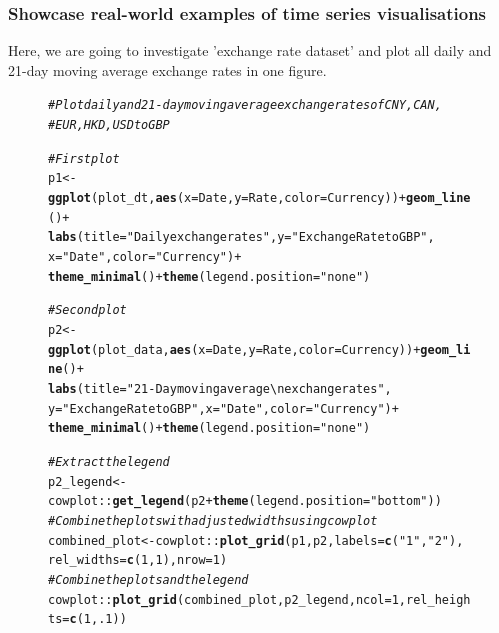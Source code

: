 \documentclass{article}\usepackage[]{graphicx}\usepackage[]{xcolor}
\makeatletter
\newcommand{\hlnum}[1]{\textcolor[rgb]{0.686,0.059,0.569}{#1}}%
\newcommand{\hlstr}[1]{\textcolor[rgb]{0.192,0.494,0.8}{#1}}%
\newcommand{\hlcom}[1]{\textcolor[rgb]{0.678,0.584,0.686}{\textit{#1}}}%
\newcommand{\hlopt}[1]{\textcolor[rgb]{0,0,0}{#1}}%
\newcommand{\hlstd}[1]{\textcolor[rgb]{0.345,0.345,0.345}{#1}}%
\newcommand{\hlkwb}[1]{\textcolor[rgb]{0.69,0.353,0.396}{#1}}%
\newcommand{\hlkwc}[1]{\textcolor[rgb]{0.333,0.667,0.333}{#1}}%
\newcommand{\hlkwd}[1]{\textcolor[rgb]{0.737,0.353,0.396}{\textbf{#1}}}%
\newenvironment{kframe}{%
 \def\at@end@of@kframe{}%
 \ifinner\ifhmode%
  \def\at@end@of@kframe{\end{minipage}}%
  \begin{minipage}{\columnwidth}%
 \fi\fi%
 \def\FrameCommand##1{\hskip\@totalleftmargin \hskip-\fboxsep
 \colorbox{shadecolor}{##1}\hskip-\fboxsep
     \hskip-\linewidth \hskip-\@totalleftmargin \hskip\columnwidth}%
 \MakeFramed {\advance\hsize-\width
   \@totalleftmargin\z@ \linewidth\hsize
   \@setminipage}}%
 {\par\unskip\endMakeFramed%
 \at@end@of@kframe}
\newenvironment{knitrout}{}{} %
\makeatother
\begin{document}
\subsubsection{Showcase real-world examples of time series visualisations}

Here, we are going to investigate 'exchange rate dataset' and plot all daily and 21-day moving average exchange rates in one figure.





\begin{figure}
\begin{knitrout}\scriptsize
{}\color{fgcolor}\begin{kframe}
\begin{alltt}
\hlcom{# Plot daily and 21-day moving average exchange rates of CNY, CAN,}
\hlcom{# EUR, HKD, USD to GBP}

\hlcom{# First plot}
\hlstd{p1} \hlkwb{<-} \hlkwd{ggplot}\hlstd{(plot_dt,} \hlkwd{aes}\hlstd{(}\hlkwc{x}\hlstd{=Date,} \hlkwc{y}\hlstd{=Rate,} \hlkwc{color}\hlstd{=Currency))} \hlopt{+} \hlkwd{geom_line}\hlstd{()} \hlopt{+}
  \hlkwd{labs}\hlstd{(}\hlkwc{title}\hlstd{=}\hlstr{"Daily exchange rates"}\hlstd{,} \hlkwc{y}\hlstd{=}\hlstr{"Exchange Rate to GBP"}\hlstd{,}
       \hlkwc{x}\hlstd{=}\hlstr{"Date"}\hlstd{,} \hlkwc{color}\hlstd{=}\hlstr{"Currency"}\hlstd{)}\hlopt{+}
  \hlkwd{theme_minimal}\hlstd{()} \hlopt{+} \hlkwd{theme}\hlstd{(}\hlkwc{legend.position}\hlstd{=}\hlstr{"none"}\hlstd{)}

\hlcom{# Second plot}
\hlstd{p2} \hlkwb{<-} \hlkwd{ggplot}\hlstd{(plot_data,} \hlkwd{aes}\hlstd{(}\hlkwc{x}\hlstd{=Date,} \hlkwc{y}\hlstd{=Rate,} \hlkwc{color}\hlstd{=Currency))} \hlopt{+} \hlkwd{geom_line}\hlstd{()} \hlopt{+}
  \hlkwd{labs}\hlstd{(}\hlkwc{title}\hlstd{=}\hlstr{"21-Day moving average \textbackslash{}n exchange rates"}\hlstd{,}
       \hlkwc{y}\hlstd{=}\hlstr{"Exchange Rate to GBP"}\hlstd{,} \hlkwc{x}\hlstd{=}\hlstr{"Date"}\hlstd{,} \hlkwc{color}\hlstd{=}\hlstr{"Currency"}\hlstd{)}\hlopt{+}
  \hlkwd{theme_minimal}\hlstd{()} \hlopt{+} \hlkwd{theme}\hlstd{(}\hlkwc{legend.position}\hlstd{=}\hlstr{"none"}\hlstd{)}

\hlcom{# Extract the legend}
\hlstd{p2_legend} \hlkwb{<-} \hlstd{cowplot}\hlopt{::}\hlkwd{get_legend}\hlstd{(p2} \hlopt{+} \hlkwd{theme}\hlstd{(}\hlkwc{legend.position}\hlstd{=}\hlstr{"bottom"}\hlstd{))}
\hlcom{# Combine the plots with adjusted widths using cowplot}
\hlstd{combined_plot} \hlkwb{<-} \hlstd{cowplot}\hlopt{::}\hlkwd{plot_grid}\hlstd{(p1, p2,} \hlkwc{labels} \hlstd{=} \hlkwd{c}\hlstd{(}\hlstr{"1"}\hlstd{,} \hlstr{"2"}\hlstd{),}
                                    \hlkwc{rel_widths} \hlstd{=} \hlkwd{c}\hlstd{(}\hlnum{1}\hlstd{,} \hlnum{1}\hlstd{),} \hlkwc{nrow}\hlstd{=}\hlnum{1}\hlstd{)}
\hlcom{# Combine the plots and the legend}
\hlstd{cowplot}\hlopt{::}\hlkwd{plot_grid}\hlstd{(combined_plot, p2_legend,} \hlkwc{ncol}\hlstd{=}\hlnum{1}\hlstd{,} \hlkwc{rel_heights} \hlstd{=} \hlkwd{c}\hlstd{(}\hlnum{1}\hlstd{,} \hlnum{.1}\hlstd{))}
\end{alltt}
\end{kframe}


\end{knitrout}
\end{figure}
\end{document}
